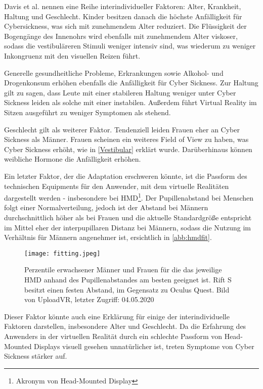 Davis et al.\cite{Davis:2014:Factors} nennen eine Reihe interindividueller Faktoren: Alter, Krankheit, Haltung und Geschlecht. Kinder besitzen danach die h\"ochste Anf\"alligkeit f\"ur Cybersickness, was sich mit zunehmendem Alter reduziert. Die Fl\"ussigkeit der Bogeng\"ange des Innenohrs wird ebenfalls mit zunehmendem Alter viskoser, sodass die vestibul\"areren Stimuli weniger intensiv sind, was wiederum zu weniger Inkongruenz mit den visuellen Reizen f\"uhrt.

Generelle gesundheitliche Probleme, Erkrankungen sowie Alkohol- und Drogenkonsum\cite{Kruk:1992:Drugs} erh\"ohen ebenfalls die Anf\"alligkeit f\"ur Cyber Sickness. Zur Haltung gilt zu sagen, dass Leute mit einer stabileren Haltung weniger unter Cyber Sickness leiden als solche mit einer instabilen. Au{\ss}erdem f\"uhrt Virtual Reality im Sitzen ausgef\"uhrt zu weniger Symptomen als stehend.

Geschlecht gilt als weiterer Faktor. Tendenziell leiden Frauen eher an Cyber Sickness als M\"anner\cite{Aldaba:2019:VRNTread}. Frauen scheinen ein weiteres Field of View zu haben, was Cyber Sickness erh\"oht, wie in \autoref{Vestibular} erkl\"art wurde. Dar\"uberhinaus k\"onnen weibliche Hormone die Anf\"alligkeit erh\"ohen\cite{Kolasinski:1995:control}.

Ein letzter Faktor, der die Adaptation erschweren k\"onnte, ist die Passform des technischen Equipments f\"ur den Anwender, mit dem virtuelle Realit\"aten dargestellt werden - insbesondere bei HMD\footnote{Akronym von Head-Mounted Display}. Der Pupillenabstand bei Menschen folgt einer Normalverteilung, jedoch ist der Abstand bei M\"annern durchschnittlich h\"oher als bei Frauen und die aktuelle Standardgr\"o{\ss}e entspricht im Mittel eher der interpupillaren Distanz bei M\"annern\cite{UploadVR:2020:HMDfit}, sodass die Nutzung im Verh\"altnis f\"ur M\"annern angenehmer ist, ersichtlich in \autoref{abb:hmdfit}. 

\begin{figure}[h]
	\centering 	
	\texttt{[image: fitting.jpeg]}
	\caption{Perzentile erwachsener M\"anner und Frauen f\"ur die das jeweilige HMD anhand des Pupillenabstandes am besten geeignet ist. Rift S besitzt einen festen Abstand, im Gegensatz zu Oculus Quest. Bild von UploadVR\cite{UploadVR:2020:HMDfit}, letzter Zugriff: 04.05.2020}
	\label{abb:hmdfit}
\end{figure}

Dieser Faktor k\"onnte auch eine Erkl\"arung f\"ur einige der interindividuelle Faktoren darstellen, insbesondere Alter und Geschlecht. Da die Erfahrung des Anwenders in der virtuellen Realit\"at durch ein schlechte Passform von Head-Mounted Displays visuell gesehen unnat\"urlicher ist, treten Symptome von Cyber Sickness st\"arker auf.





